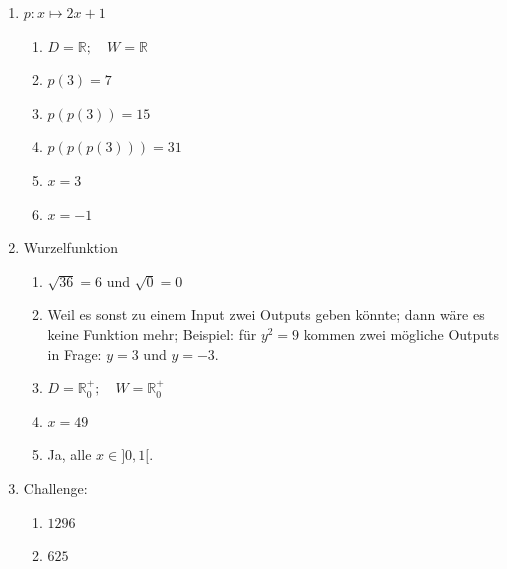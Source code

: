 \begin{enumerate}
\begin{enumerate}
              \item $|a|\cdot\operatorname{sgn}(a)=a$
          \end{enumerate}

    \item
          $p:x\mapsto 2x+1$

          \begin{enumerate}
              \item $D=\mathbb{R};
                        \quad W=\mathbb{R}$ %

              \item $p(3)=7$

              \item $p(p(3))=15$

              \item $p(p(p(3)))=31$

              \item $x=3$ %

              \item $x=-1$ %
          \end{enumerate}

    \item Wurzelfunktion

          \begin{enumerate}
              \item $\sqrt{36}=6$ und $\sqrt{0}=0$

              \item Weil es sonst zu einem Input zwei Outputs geben könnte;
                    dann wäre es keine Funktion mehr; Beispiel: für $y^2=9$ kommen zwei mögliche Outputs in Frage: $y=3$ und $y=-3$.

              \item $D=\mathbb{R}_0^+;
                        \quad W=\mathbb{R}_0^+$

              \item $x=49$ %

              \item Ja, alle $x\in]0,1[$.
          \end{enumerate}

    \item Challenge:

          \begin{enumerate}
              \item $1296$
              \item $625$
          \end{enumerate}

\end{enumerate}
\newpage

